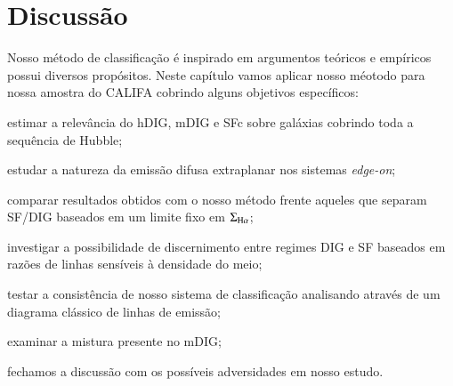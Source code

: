 


\chapter{Discussão}
\label{sec:DIGdisc}

Nosso método de classificação é inspirado em argumentos teóricos e empíricos possui diversos propósitos. Neste capítulo vamos aplicar nosso méotodo para nossa amostra do CALIFA cobrindo alguns objetivos específicos:
\begin{enumerate*}[label=(\roman*)]
    \item estimar a relevância do hDIG, mDIG e SFc sobre galáxias cobrindo toda a sequência de Hubble;
    \item estudar a natureza da emissão difusa extraplanar nos sistemas {\em edge-on};
    \item comparar resultados obtidos com o nosso método frente aqueles que separam SF/DIG baseados em um limite fixo em $\Sigma_{\Ha}$;
    \item investigar a possibilidade de discernimento entre regimes DIG e SF baseados em razões de linhas sensíveis à densidade do meio;
    \item testar a consistência de nosso sistema de classificação analisando através de um diagrama clássico de linhas de emissão;
    \item examinar a mistura presente no mDIG;
    \item fechamos a discussão com os possíveis adversidades em nosso estudo.
\end{enumerate*}

